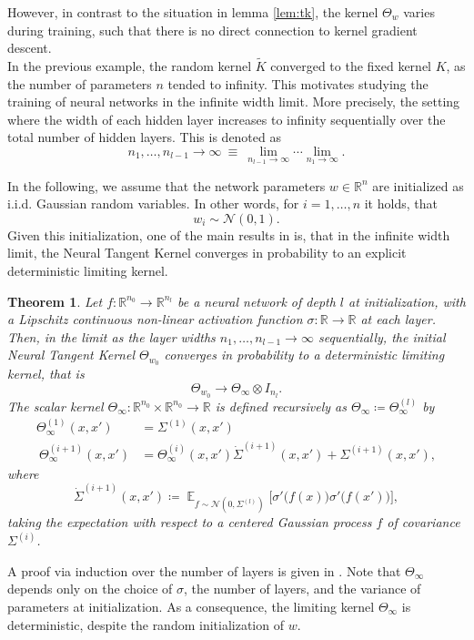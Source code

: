 \documentclass[11pt, a4paper]{article}
\newtheorem{theorem}{Theorem}[section]
\newcommand{\R}{\mathbb{R}}
\DeclareMathOperator*{\E}{\mathbb{E}}
\begin{document}
However, in contrast to the situation in lemma \ref{lem:tk}, the kernel $\Theta_w$ varies during training, such that there is no direct connection to kernel gradient descent.\\

In the previous example, the random kernel $\tilde{K}$ converged to the fixed kernel $K$, as the number of parameters $n$ tended to infinity. This motivates studying the training of neural networks in the infinite width limit. More precisely, the setting where the width of each hidden layer increases to infinity sequentially over the total number of hidden layers. This is denoted as
\[ n_1, \dots, n_{l-1} \to \infty \ \equiv \ \lim_{n_{l-1} \to \infty} \cdots \lim_{n_1 \to \infty}. \]

In the following, we assume that the network parameters $w \in \R^n$ are initialized as i.i.d. Gaussian random variables. In other words, for $i=1, \dots, n$ it holds, that
\[ w_i \sim \mathcal{N}(0,1). \] 
Given this initialization, one of the main results in \cite{NTK} is, that in the infinite width limit, the Neural Tangent Kernel converges in probability to an explicit deterministic limiting kernel.

\begin{theorem}
Let $f: \R^{n_0} \to \R^{n_l}$ be a neural network of depth $l$ at initialization, with a Lipschitz continuous non-linear activation function $\sigma: \R \to \R$ at each layer. Then, in the limit as the layer widths $n_1, \dots, n_{l-1} \to \infty$ sequentially, the initial Neural Tangent Kernel $\Theta_{w_0}$ converges in probability to a deterministic limiting kernel, that is
\[ \Theta_{w_0} \to \Theta_{\infty} \otimes I_{n_l}. \]
The scalar kernel $\Theta_{\infty} : \R^{n_0} \times \R^{n_0} \to \R$ is defined recursively as $\Theta_{\infty} \coloneq \Theta_{\infty}^{(l)}$ by
\[ \begin{split} 
\Theta_{\infty}^{(1)} (x,x') &= \Sigma^{(1)}(x,x') \\\
\Theta_{\infty}^{(i+1)}(x,x') &= \Theta_{\infty}^{(i)}(x,x') \dot{\Sigma}^{(i+1)}(x,x') + \Sigma^{(i+1)}(x,x'),
\end{split} \]
where 
\[ \dot{\Sigma}^{(i+1)}(x,x') \coloneq \E_{f \sim \mathcal{N}(0, \Sigma^{(l)})} \Big [ \sigma' \big ( f(x) \big ) \sigma' \big ( f(x') \big) \Big ], \]
taking the expectation with respect to a centered Gaussian process $f$ of covariance $\Sigma^{(i)}$.
\end{theorem}

A proof via induction over the number of layers is given in \cite{NTK}. Note that $\Theta_{\infty}$ depends only on the choice of $\sigma$, the number of layers, and the variance of parameters at initialization. As a consequence, the limiting kernel $\Theta_{\infty}$ is deterministic, despite the random initialization of $w$. \\
\end{document}
